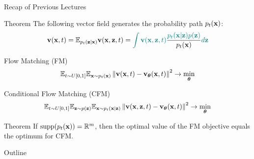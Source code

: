 \documentclass{beamer}
\begin{document}
\begin{frame}{Recap of Previous Lectures}
	\begin{block}{Theorem}
		The following vector field generates the probability path $p_t(\mathbf{x})$:
		\vspace{-0.2cm}
		\[
			\mathbf{v}(\mathbf{x}, t) = \mathbb{E}_{p_t(\mathbf{z} | \mathbf{x})} \mathbf{v}(\mathbf{x}, \mathbf{z}, t)  = {\color{teal}\int \mathbf{v}(\mathbf{x}, \mathbf{z}, t)} \frac{\color{teal}p_t(\mathbf{x} | \mathbf{z}) p(\mathbf{z})}{p_t(\mathbf{x})} {\color{teal}d \mathbf{z}}
		\]
		\vspace{-0.5cm}
	\end{block}
	\begin{block}{Flow Matching (FM)}
		\vspace{-0.5cm}
		\[
			\mathbb{E}_{t \sim U[0, 1]} \mathbb{E}_{\mathbf{x} \sim p_t(\mathbf{x})}\left\| \mathbf{v}(\mathbf{x}, t) - \mathbf{v}_{\boldsymbol{\theta}}(\mathbf{x}, t) \right\|^2 \rightarrow \min_{\boldsymbol{\theta}}
		\]
		\vspace{-0.5cm}
	\end{block}
	\begin{block}{Conditional Flow Matching (CFM)}
		\vspace{-0.5cm}
		\[
			\mathbb{E}_{t \sim U[0, 1]} \mathbb{E}_{\mathbf{z} \sim p(\mathbf{z})} \mathbb{E}_{\mathbf{x} \sim p_t(\mathbf{x} | \mathbf{z})}\left\| \mathbf{v}(\mathbf{x}, \mathbf{z}, t) - \mathbf{v}_{\boldsymbol{\theta}}(\mathbf{x}, t) \right\|^2 \rightarrow \min_{\boldsymbol{\theta}}
		\]
		\vspace{-0.7cm}
	\end{block}
	\begin{block}{Theorem}
		If $\operatorname{supp}(p_t(\mathbf{x})) = \mathbb{R}^m$, then the optimal value of the FM objective equals the optimum for CFM.
	\end{block}
\end{frame}





\begin{frame}{Outline}
	\tableofcontents[part=12]
\end{frame}
\end{document}
